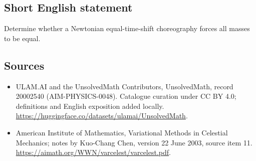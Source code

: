 \documentclass[11pt]{article}
\begin{document}
\subsection{Short English statement}
Determine whether a Newtonian equal-time-shift choreography forces all masses to be equal.
\subsection{Sources}
\begin{itemize}
\item[\hypertarget{source:20002540:1}{S1}] ULAM.AI and the UnsolvedMath Contributors, UnsolvedMath, record 20002540 (AIM-PHYSICS-0048). Catalogue curation under CC BY 4.0; definitions and English exposition added locally.
\url{https://huggingface.co/datasets/ulamai/UnsolvedMath}.
\item[\hypertarget{source:20002540:2}{S2}] American Institute of Mathematics, Variational Methods in Celestial Mechanics; notes by Kuo-Chang Chen, version 22 June 2003, source item 11.
\url{https://aimath.org/WWN/varcelest/varcelest.pdf}.
\end{itemize}
\label{end:20002540}
\end{document}
